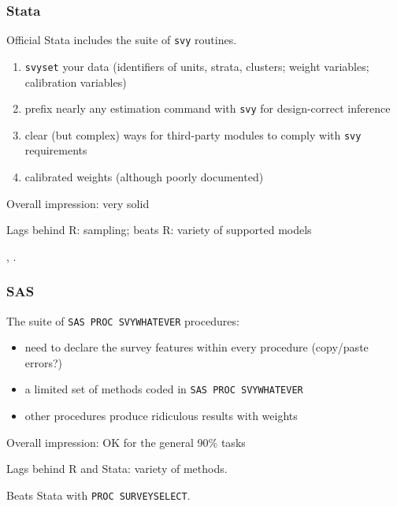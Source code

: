 \documentclass{beamer}
\begin{document}
\begin{frame}\frametitle{Stata}

Official Stata includes the suite of \texttt{svy} routines.

\begin{enumerate}
    \item \texttt{svyset} your data (identifiers of units, strata, clusters; weight variables; calibration variables)
    \item prefix nearly any estimation command with \texttt{svy} for design-correct inference
    \item clear (but complex) ways for third-party modules to comply with \texttt{svy} requirements
    \item calibrated weights (although poorly documented)
\end{enumerate}

Overall impression: very solid

Lags behind R: sampling; beats R: variety of supported models

\medskip

\citet{heeringa:west:berglund:2017}, \citet{kolenikov:pitblado:2014}.

\end{frame}

\begin{frame}\frametitle{SAS}


The suite of \texttt{SAS PROC SVYWHATEVER} procedures:

\begin{itemize}
    \item need to declare the survey features within every procedure (copy/paste errors?)
    \item a limited set of methods coded in \texttt{SAS PROC SVYWHATEVER}
    \item other procedures produce ridiculous results with weights
\end{itemize}

\bigskip

Overall impression: OK for the general 90\% tasks

\bigskip

Lags behind R and Stata: variety of methods.

\medskip

Beats Stata with \texttt{PROC SURVEYSELECT}.

\end{frame}
\end{document}
